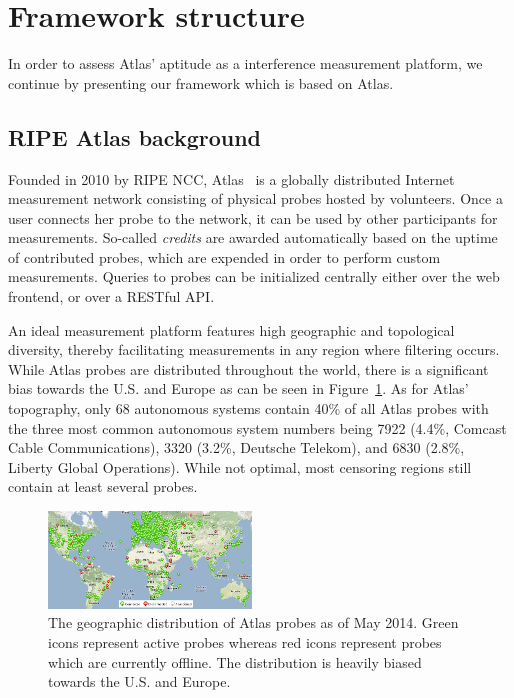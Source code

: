 \section{Framework structure}
\label{sec:framework}
In order to assess Atlas' aptitude as a interference measurement platform, we
continue by presenting our framework which is based on Atlas.

\subsection{RIPE Atlas background}
Founded in 2010 by RIPE NCC, Atlas~\cite{atlas} is a globally
distributed Internet measurement network consisting of physical probes hosted
by volunteers.  Once a user connects her probe to the network, it can be used
by other participants for measurements. So-called \emph{credits} are awarded
automatically based on the uptime of contributed probes, which are expended in
order to perform custom measurements. Queries to probes can be initialized
centrally either over the web frontend, or over a RESTful API.

An ideal measurement platform features high geographic and
topological diversity, thereby facilitating measurements in any region where
filtering occurs.  While Atlas probes are distributed throughout the world,
there is a significant bias towards the U.S. and Europe as can be seen in
Figure~\ref{fig:probe_distribution}.  As for Atlas' topography, only 68
autonomous systems contain 40\% of all Atlas probes with the three most common
autonomous system numbers being 7922 (4.4\%, Comcast Cable Communications),
3320 (3.2\%, Deutsche Telekom), and 6830 (2.8\%, Liberty Global Operations).
While not optimal, most censoring regions still contain at least several
probes.

\begin{figure}[t]
\centering
\includegraphics[width=0.48\textwidth]{diagrams/probe_distribution.jpg}
\caption{The geographic distribution of Atlas probes as of May 2014.  Green
icons represent active probes whereas red icons represent probes which are
currently offline.  The distribution is heavily biased towards the U.S. and
Europe.} \label{fig:probe_distribution}
\end{figure}

